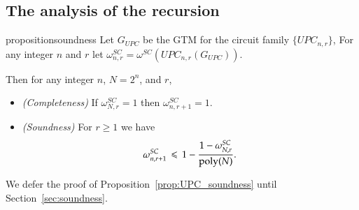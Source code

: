 \subsection{The analysis of the recursion}

\begin{restatable}{proposition}{soundness}
	Let $G_{UPC}$ be the GTM for the circuit family $\{UPC_{n,r}\}$, %
	For any integer $n$ and $r$ let $\omega_{n,r}^{SC} = \omega^{SC}(UPC_{n,r}(G_{UPC}))$.
	
	Then for any integer $n$, $N=2^n$, and $r$,
	\begin{itemize}
	\item \emph{(Completeness)} If $\omega_{N,r}^{SC}=1$ then $\omega_{n,r+1}^{SC}=1$.
	\item \emph{(Soundness)} For $r \geq 1$ we have
	\[
		\omega_{n,r+1}^{SC} \,\leqslant\, 1 - \frac{1 - \omega_{N,r}^{SC}}{\operatorname{poly}(N)}.
	\]
	\end{itemize}
	\label{prop:UPC_soundness}
\end{restatable}

We defer the proof of Proposition~\ref{prop:UPC_soundness} until Section~\ref{sec:soundness}. 


